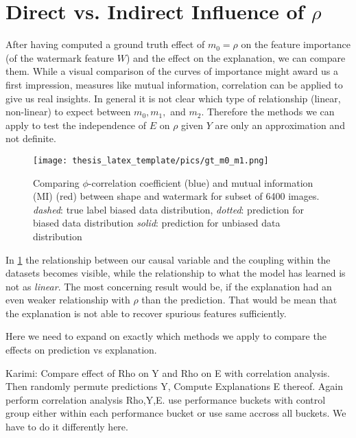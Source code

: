\section{Direct vs. Indirect Influence of $\rho$}
After having computed a ground truth effect of $m_0 = \rho$ on the feature importance (of the watermark feature $W$) and the effect on the explanation, we can compare them.
While a visual comparison of the curves of importance might award us a first impression, measures like mutual information, correlation can be applied to give us real insights. 
In general it is not clear which type of relationship (linear, non-linear) to expect between $m_0, m_1, $ and $m_2$. Therefore the methods we can apply to test the independence of $E$ on $\rho$ given $Y$ are only an approximation and not definite.

\begin{figure}
    \centering
    \texttt{[image: thesis\_latex\_template/pics/gt\_m0\_m1.png]}
    \caption[$m_0$ vs. $m_1$]{Comparing $\phi$-correlation coefficient (blue) and mutual information (MI) (red) between shape and watermark for subset of 6400 images. \\ \textit{dashed}: true label biased data distribution, \textit{dotted}: prediction for biased data distribution \textit{solid}: prediction for unbiased data distribution }
    \label{fig:m0_m1}
\end{figure}

In \cref{fig:m0_m1} the relationship between our causal variable and the coupling within the datasets becomes visible, while the relationship to what the model has learned is not as \textit{linear}. The most concerning result would be, if the explanation had an even weaker relationship with $\rho$ than the prediction. That would be mean that the explanation is not able to recover spurious features sufficiently. 

Here we need to expand on exactly which methods we apply to compare the effects on prediction vs explanation. 

Karimi: Compare effect of Rho on Y and Rho on E with correlation analysis. Then randomly permute predictions Y, Compute Explanations E thereof. Again perform correlation analysis Rho,Y,E. 
use performance buckets with control group either within each performance bucket or use same accross all buckets. 
We have to do it differently here.


